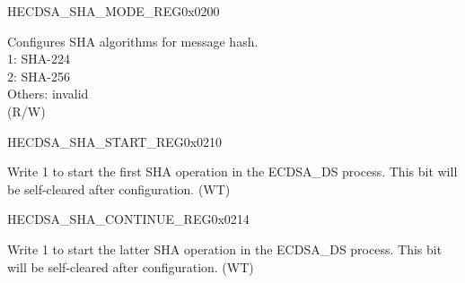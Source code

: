 \begin{register}{H}{ECDSA\_SHA\_MODE\_REG}{0x0200}\label{regdesc:ECDSASHAMODEREG}
%
%
\regnewline%
\begin{regdesc}\begin{reglist}
\label{fielddesc:ECDSASHAMODE}\item [ECDSA\_SHA\_MODE] Configures SHA algorithms for message hash. \\
1: SHA-224\\
2: SHA-256\\
Others: invalid\\
(R/W)
\end{reglist}\end{regdesc}
\end{register}


\begin{register}{H}{ECDSA\_SHA\_START\_REG}{0x0210}\label{regdesc:ECDSASHASTARTREG}
%
%
\regnewline%
\begin{regdesc}\begin{reglist}
\label{fielddesc:ECDSASHASTART}\item [ECDSA\_SHA\_START] Write 1 to start the first SHA operation in the ECDSA\_DS process. This bit will be self-cleared after configuration. (WT)
\end{reglist}\end{regdesc}
\end{register}


\begin{register}{H}{ECDSA\_SHA\_CONTINUE\_REG}{0x0214}\label{regdesc:ECDSASHACONTINUEREG}
%
%
\regnewline%
\begin{regdesc}\begin{reglist}
\label{fielddesc:ECDSASHACONTINUE}\item [ECDSA\_SHA\_CONTINUE] Write 1 to start the latter SHA operation in the ECDSA\_DS process. This bit will be self-cleared after configuration. (WT)
\end{reglist}\end{regdesc}
\end{register}


